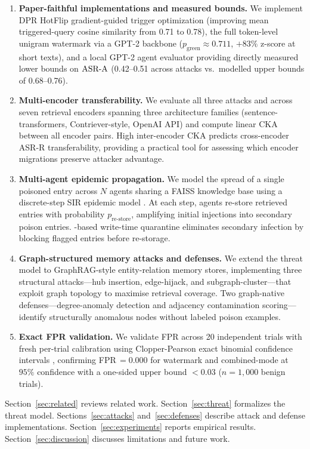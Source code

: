 \begin{enumerate}
  \item \textbf{Paper-faithful implementations and measured bounds.}  We
  implement DPR HotFlip gradient-guided trigger optimization
  (improving mean triggered-query cosine similarity from 0.71 to 0.78),
  the full token-level unigram watermark \citep{zhao2024watermark} via a
  GPT-2 backbone ($p_{\text{green}} \approx 0.711$, $+83\%$ z-score at
  short texts), and a local GPT-2 agent evaluator providing directly measured
  lower bounds on $\text{ASR-A}$ (0.42--0.51 across attacks vs.\ modelled
  upper bounds of 0.68--0.76).

  \item \textbf{Multi-encoder transferability.}  We evaluate all three
  attacks and \sad{} across seven retrieval encoders spanning three
  architecture families (sentence-transformers, Contriever-style, OpenAI
  API) and compute linear CKA \citep{kornblith2019similarity} between all
  encoder pairs.  High inter-encoder CKA predicts cross-encoder ASR-R
  transferability, providing a practical tool for assessing which encoder
  migrations preserve attacker advantage.

  \item \textbf{Multi-agent epidemic propagation.}  We model the spread of
  a single poisoned entry across $N$ agents sharing a FAISS knowledge base
  using a discrete-step SIR epidemic model \citep{gu2024agentsmith}.
  At each step, agents re-store retrieved entries with probability
  $p_{\text{re-store}}$, amplifying initial injections into secondary
  poison entries.  \sad{}-based write-time quarantine eliminates secondary
  infection by blocking flagged entries before re-storage.

  \item \textbf{Graph-structured memory attacks and defenses.}  We extend
  the threat model to GraphRAG-style entity-relation memory stores,
  implementing three structural attacks---hub insertion, edge-hijack, and
  subgraph-cluster---that exploit graph topology to maximise retrieval
  coverage.  Two graph-native defenses---degree-anomaly detection and
  adjacency contamination scoring---identify structurally anomalous nodes
  without labeled poison examples.

  \item \textbf{Exact FPR validation.}  We validate FPR across 20
  independent trials with fresh per-trial calibration using Clopper-Pearson
  exact binomial confidence intervals \citep{clopper1934use}, confirming
  FPR\,$=0.000$ for watermark and \sad{} combined-mode at $95\%$ confidence
  with a one-sided upper bound $< 0.03$ ($n = 1{,}000$ benign trials).
\end{enumerate}

Section~\ref{sec:related} reviews related work.
Section~\ref{sec:threat} formalizes the threat model.
Sections~\ref{sec:attacks} and~\ref{sec:defenses} describe attack and defense
implementations.  Section~\ref{sec:experiments} reports empirical results.
Section~\ref{sec:discussion} discusses limitations and future work.

